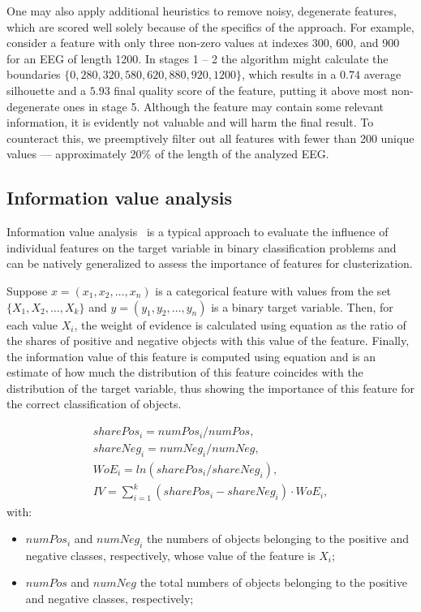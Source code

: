 \documentclass[10pt]{iopart}
\begin{document}
One may also apply additional heuristics to remove noisy, degenerate features, which are scored well solely because of the specifics of the approach. For example, consider a feature with only three non-zero values at indexes 300, 600, and 900 for an EEG of length 1200. In stages 1 -- 2 the algorithm might calculate the boundaries $\{ 0, 280, 320, 580, 620, 880, 920, 1200 \}$, which results in a $0.74$ average silhouette and a $5.93$ final quality score of the feature, putting it above most non-degenerate ones in stage 5. Although the feature may contain some relevant information, it is evidently not valuable and will harm the final result. To counteract this, we preemptively filter out all features with fewer than 200 unique values --- approximately 20\% of the length of the analyzed EEG.\@

\subsection{Information value analysis}

Information value analysis~\cite{InformationValue} is a typical approach to evaluate the influence of individual features on the target variable in binary classification problems and can be natively generalized to assess the importance of features for clusterization.

Suppose $x=(x_1, x_2, \ldots, x_n)$ is a categorical feature with values from the set $\{ X_1, X_2, \ldots, X_k \}$ and $y=(y_1, y_2, \ldots, y_n)$ is a binary target variable. Then, for each value $X_i$, the weight of evidence is calculated using equation  as the ratio of the shares of positive and negative objects with this value of the feature. Finally, the information value of this feature is computed using equation  and is an estimate of how much the distribution of this feature coincides with the distribution of the target variable, thus showing the importance of this feature for the correct classification of objects.

\begin{eqnarray}
    sharePos_i = numPos_i / numPos, \nonumber\\
    shareNeg_i = numNeg_i / numNeg, \nonumber\\
    WoE_i = ln(sharePos_i / shareNeg_i), \label{eq2}\\
    IV = \sum_{i = 1}^{k} (sharePos_i - shareNeg_i) \cdot WoE_i, \label{eq3}
\end{eqnarray}
with:
\begin{itemize}
    \item
        $numPos_i$ and $numNeg_i$ the numbers of objects belonging to the positive and negative classes, respectively, whose value of the feature is $X_i$;
    \item
        $numPos$ and $numNeg$ the total numbers of objects belonging to the positive and negative classes, respectively;
\end{itemize}
\end{document}
